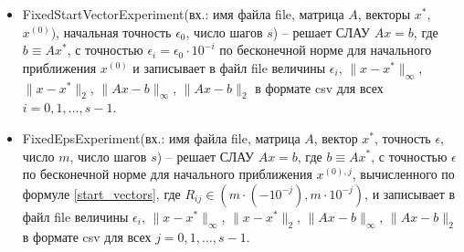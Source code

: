 \documentclass[a4paper, 12pt]{article}
\theoremstyle{definition}
\begin{document}
\begin{itemize}
		\item FixedStartVectorExperiment(вх.: имя файла file, матрица $A$, векторы $x^*$, $x^{(0)})$, начальная точность $\epsilon_0$, число шагов $s$) -- решает СЛАУ $Ax=b$, где $b\equiv Ax^*$, с точностью ${\epsilon_i=\epsilon_0 \cdot 10^{-i}}$ по бесконечной норме для начального приближения $x^{(0)}$ и записывает в файл file величины $\epsilon_i$, $\|x-x^*\|_{\infty}$, $\|x-x^*\|_{2}$, $\|Ax-b\|_{\infty}$, $\|Ax-b\|_{2}$ в формате csv для всех $i=0,1,...,s-1$.
		\item FixedEpsExperiment(вх.: имя файла file, матрица $A$, вектор $x^*$, точность $\epsilon$, число $m$, число шагов $s$) -- решает СЛАУ $Ax=b$, где $b\equiv Ax^*$, с точностью $\epsilon$ по бесконечной норме для начального приближения $x^{(0),j}$, вычисленного по формуле \eqref{start_vectors}, где ${R_{ij}\in(m\cdot (-10^{-j}), m\cdot 10^{-j})}$, и записывает в файл file величины $\epsilon_i$, $\|x-x^*\|_{\infty}$, $\|x-x^*\|_{2}$, $\|Ax-b\|_{\infty}$, $\|Ax-b\|_{2}$ в формате csv для всех $j=0,1,...,s-1$.
	\end{itemize}
	
\end{document}
